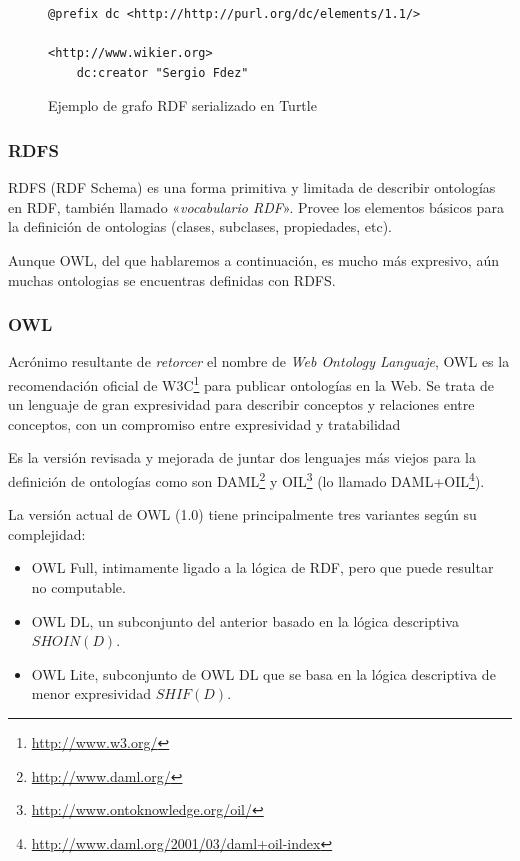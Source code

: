\begin{figure}[H]
\lstset{language=XML}
\begin{lstlisting}
@prefix dc <http://http://purl.org/dc/elements/1.1/>

<http://www.wikier.org> 
	dc:creator "Sergio Fdez"
\end{lstlisting}
\caption{Ejemplo de grafo RDF serializado en Turtle}
\label{fig:ejemplo.rdfturtle}
\end{figure}

\subsubsection{RDFS}

RDFS\cite{RDFS} (RDF Schema) es una forma primitiva y limitada de describir 
ontologías en RDF, también llamado «\emph{vocabulario RDF}». Provee los elementos
básicos para la definición de ontologias (clases, subclases, propiedades, etc).

Aunque OWL, del que hablaremos a continuación, es mucho más expresivo, aún muchas
ontologias se encuentras definidas con RDFS.

\subsubsection{OWL}

Acrónimo resultante de \emph{retorcer} el nombre de 
\emph{Web Ontology Languaje}, OWL\cite{OWL} es la recomendación 
oficial de W3C\footnote{\url{http://www.w3.org/}} para publicar ontologías en 
la Web. Se trata de un lenguaje de gran expresividad para describir conceptos 
y relaciones entre conceptos, con un compromiso entre expresividad y tratabilidad

Es la versión revisada y mejorada de juntar dos lenguajes más viejos para la 
definición de ontologías como son DAML\footnote{\url{http://www.daml.org/}} y 
OIL\footnote{\url{http://www.ontoknowledge.org/oil/}} (lo llamado
DAML+OIL\footnote{\url{http://www.daml.org/2001/03/daml+oil-index}}).

La versión actual de OWL (1.0) tiene principalmente tres variantes según su
complejidad:

\begin{itemize}
  \item OWL Full, intimamente ligado a la lógica de RDF, pero que puede resultar
	no computable.
  \item OWL DL, un subconjunto del anterior basado en la lógica descriptiva 
	${SHOIN} (D)$.
  \item OWL Lite, subconjunto de OWL DL que se basa en la lógica descriptiva 
	de menor expresividad ${SHIF} (D)$.
\end{itemize}


